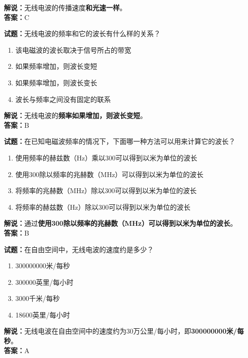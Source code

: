 \documentclass{ctexbook}
\begin{document}
\noindent\textbf{解说：}无线电波的传播速度\textbf{和光速一样}。\\\noindent\textbf{答案：}C


\bigskip


\noindent\textbf{试题：}无线电波的频率和它的波长有什么样的关系？

\begin{enumerate}[leftmargin=3em]
	\item 该电磁波的波长取决于信号所占的带宽
	\item 如果频率增加，则波长变短
	\item 如果频率增加，则波长变长
	\item 波长与频率之间没有固定的联系
\end{enumerate}

\noindent\textbf{解说：}无线电波的\textbf{频率如果增加，则波长变短}。\\\noindent\textbf{答案：}B


\bigskip


\noindent\textbf{试题：}在已知电磁波频率的情况下，下面哪一种方法可以用来计算它的波长？

\begin{enumerate}[leftmargin=3em]
	\item 使用频率的赫兹数（Hz）乘以300可以得到以米为单位的波长
	\item 使用300除以频率的兆赫数（MHz）可以得到以米为单位的波长
	\item 将频率的兆赫数（MHz）除以300可以得到以米为单位的波长
	\item 将频率的赫兹数（Hz）除以300可以得到以米为单位的波长
\end{enumerate}

\noindent\textbf{解说：}通过\textbf{使用300除以频率的兆赫数（MHz）可以得到以米为单位的波长}。\\\noindent\textbf{答案：}B


\bigskip


\noindent\textbf{试题：}在自由空间中，无线电波的速度约是多少？

\begin{enumerate}[leftmargin=3em]
	\item 300000000米/每秒
	\item 300000英里/每小时
	\item 3000千米/每秒
	\item 18600英里/每小时
\end{enumerate}

\noindent\textbf{解说：}无线电波在自由空间中的速度约为30万公里/每小时，即\textbf{300000000米/每秒}。\\\noindent\textbf{答案：}A
\end{document}
